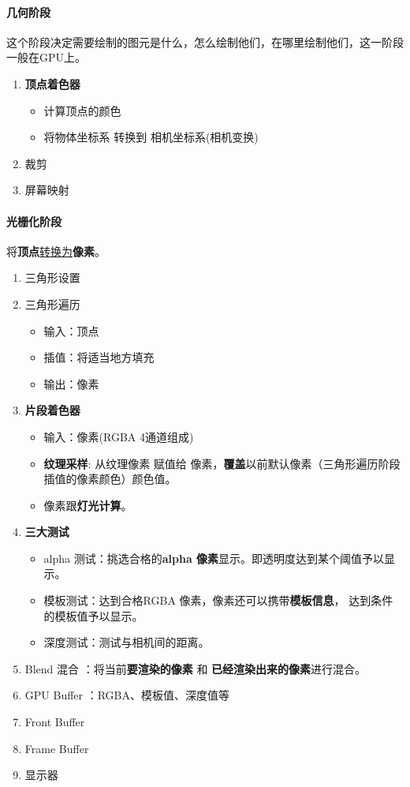\documentclass[UTF8,a4paper,12pt]{ctexbook}
\begin{document}
		\paragraph{几何阶段}
			这个阶段决定需要绘制的图元是什么，怎么绘制他们，在哪里绘制他们，这一阶段一般在GPU上。
			
			\begin{enumerate}
				\item \textbf{顶点着色器}
					\begin{itemize}
						\item 计算顶点的颜色
						\item 将物体坐标系 转换到 相机坐标系(相机变换)
					\end{itemize}
				\item 裁剪
				\item 屏幕映射
			\end{enumerate}
		
		\paragraph{光栅化阶段}
			将\textbf{顶点}\underline{转换为}\textbf{像素}。
			
			\begin{enumerate}
				\item 三角形设置
				\item 三角形遍历
					\begin{itemize}
						\item 输入：顶点
						\item 插值：将适当地方填充
						\item 输出：像素
					\end{itemize}
				\item \textbf{片段着色器}
					\begin{itemize}
						\item 输入：像素(RGBA 4通道组成)
						\item \textbf{纹理采样}: 从纹理像素 赋值给 像素，\textbf{覆盖}以前默认像素（三角形遍历阶段插值的像素颜色）颜色值。
						\item 像素跟\textbf{灯光计算}。
					\end{itemize}					
				\item \textbf{三大测试}
					\begin{itemize}
						\item alpha 测试：挑选合格的\textbf{alpha 像素}显示。即透明度达到某个阈值予以显示。
						\item 模板测试：达到合格RGBA 像素，像素还可以携带\textbf{模板信息}， 达到条件的模板值予以显示。
						\item 深度测试：测试与相机间的距离。
					\end{itemize}
				\item Blend 混合 ：将当前\textbf{要渲染的像素} 和 \textbf{已经渲染出来的像素}进行混合。
				\item GPU Buffer ：RGBA、模板值、深度值等
				\item Front Buffer 
				\item Frame Buffer
				\item 显示器
			\end{enumerate}
	
\end{document}

